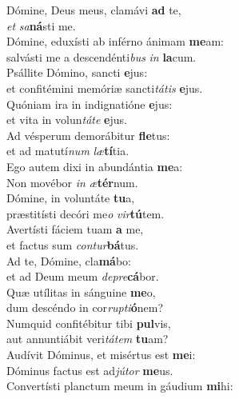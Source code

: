 \evenverse Dómine, Deus meus, clamávi \textbf{ad} te,~\*\\
\evenverse \textit{et} \textit{sa}\textbf{ná}sti me.\\
\oddverse Dómine, eduxísti ab inférno ánimam \textbf{me}am:~\*\\
\oddverse salvásti me a descendénti\textit{bus} \textit{in} \textbf{la}cum.\\
\evenverse Psállite Dómino, sancti \textbf{e}jus:~\*\\
\evenverse et confitémini memóriæ sancti\textit{tá}\textit{tis} \textbf{e}jus.\\
\oddverse Quóniam ira in indignatióne \textbf{e}jus:~\*\\
\oddverse et vita in volun\textit{tá}\textit{te} \textbf{e}jus.\\
\evenverse Ad vésperum demorábitur \textbf{fle}tus:~\*\\
\evenverse et ad matutí\textit{num} \textit{læ}\textbf{tí}tia.\\
\oddverse Ego autem dixi in abundántia \textbf{me}a:~\*\\
\oddverse Non movébor \textit{in} \textit{æ}\textbf{tér}num.\\
\evenverse Dómine, in voluntáte \textbf{tu}a,~\*\\
\evenverse præstitísti decóri me\textit{o} \textit{vir}\textbf{tú}tem.\\
\oddverse Avertísti fáciem tuam \textbf{a} me,~\*\\
\oddverse et factus sum \textit{con}\textit{tur}\textbf{bá}tus.\\
\evenverse Ad te, Dómine, cla\textbf{má}bo:~\*\\
\evenverse et ad Deum meum \textit{de}\textit{pre}\textbf{cá}bor.\\
\oddverse Quæ utílitas in sánguine \textbf{me}o,~\*\\
\oddverse dum descéndo in cor\textit{rup}\textit{ti}\textbf{ó}nem?\\
\evenverse Numquid confitébitur tibi \textbf{pul}vis,~\*\\
\evenverse aut annuntiábit veri\textit{tá}\textit{tem} \textbf{tu}am?\\
\oddverse Audívit Dóminus, et misértus est \textbf{me}i:~\*\\
\oddverse Dóminus factus est ad\textit{jú}\textit{tor} \textbf{me}us.\\
\evenverse Convertísti planctum meum in gáudium \textbf{mi}hi:~\*\\
